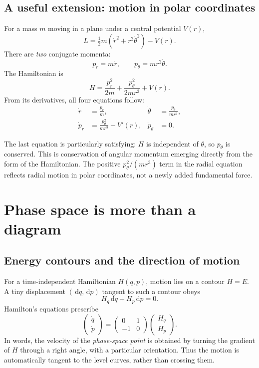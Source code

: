 \documentclass[11pt,a4paper,oneside]{article}
\newcommand{\dd}{\,\mathrm d}
\begin{document}
\subsection{A useful extension: motion in polar coordinates}
For a mass $m$ moving in a plane under a central potential $V(r)$,
\[
 L=\tfrac12m\left(\dot r^2+r^2\dot\theta^2\right)-V(r).
\]
There are \emph{two} conjugate momenta:
\[
 p_r=m\dot r,\qquad p_\theta=mr^2\dot\theta.
\]
The Hamiltonian is
\begin{equation}\label{eq:polarH}
 \boxed{H=\frac{p_r^2}{2m}+\frac{p_\theta^2}{2mr^2}+V(r).}
\end{equation}
From its derivatives, all four equations follow:
\begin{align*}
 \dot r&=\frac{p_r}{m},
 &\dot\theta&=\frac{p_\theta}{mr^2},\\
 \dot p_r&=\frac{p_\theta^2}{mr^3}-V'(r),
 &\dot p_\theta&=0.
\end{align*}

The last equation is particularly satisfying: $H$ is independent of $\theta$, so $p_\theta$ is conserved. This is conservation of angular momentum emerging directly from the form of the Hamiltonian. The positive $p_\theta^2/(mr^3)$ term in the radial equation reflects radial motion in polar coordinates, not a newly added fundamental force.

\section{Phase space is more than a diagram}
\subsection{Energy contours and the direction of motion}
For a time-independent Hamiltonian $H(q,p)$, motion lies on a contour $H=E$. A tiny displacement $(\dd q,\dd p)$ tangent to such a contour obeys
\[
 H_q\dd q+H_p\dd p=0.
\]
Hamilton's equations prescribe
\[
 \begin{pmatrix}\dot q\\\dot p\end{pmatrix}
 =\begin{pmatrix}0&1\\-1&0\end{pmatrix}
 \begin{pmatrix}H_q\\H_p\end{pmatrix}.
\]
In words, the velocity of the \emph{phase-space point} is obtained by turning the gradient of $H$ through a right angle, with a particular orientation. Thus the motion is automatically tangent to the level curves, rather than crossing them.
\end{document}

